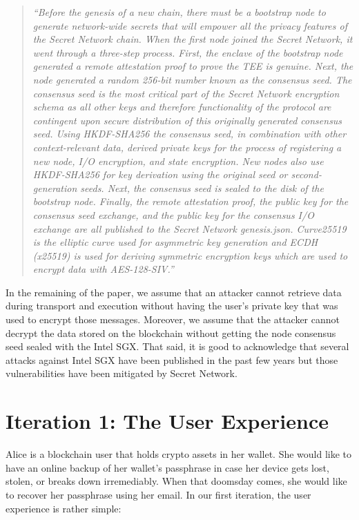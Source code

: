 \documentclass[runningheads]{llncs}
\begin{document}
\begin{quote}
{\em ``Before the genesis of a new chain, there must be a bootstrap node to generate network-wide secrets that will empower all the privacy features of the Secret Network chain. When the first node joined the Secret Network, it went through a three-step process. First, the enclave of the bootstrap node generated a remote attestation proof to prove the TEE is genuine. Next, the node generated a random 256-bit number known as the consensus seed. The consensus seed is the most critical part of the Secret Network encryption schema as all other keys and therefore functionality of the protocol are contingent upon secure distribution of this originally generated consensus seed. Using HKDF-SHA256 the consensus seed, in combination with other context-relevant data, derived private keys for the process of registering a new node, I/O encryption, and state encryption. New nodes also use HKDF-SHA256 for key derivation using the original seed or second-generation seeds. Next, the consensus seed is sealed to the disk of the bootstrap node. Finally, the remote attestation proof, the public key for the consensus seed exchange, and the public key for the consensus I/O exchange are all published to the Secret Network genesis.json. Curve25519 is the elliptic curve used for asymmetric key generation and ECDH (x25519) is used for deriving symmetric encryption keys which are used to encrypt data with AES-128-SIV.''}\\
\end{quote}

In the remaining of the paper, we assume that an attacker cannot retrieve data during transport and execution without having the user's private key that was used to encrypt those messages. Moreover, we assume that the attacker cannot decrypt the data stored on the blockchain without getting the node consensus seed sealed with the Intel SGX. That said, it is good to acknowledge that several attacks against Intel SGX have been published in the past few years \cite{gotzfried2017cache,nilsson2020survey,murdock2020plundervolt,biondo2018guard} but those vulnerabilities have been mitigated by Secret Network. \\

\section{Iteration 1: The User Experience}
\label{iteration1}

Alice is a blockchain user that holds crypto assets in her wallet. She would like to have an online backup of her wallet's passphrase in case her device gets lost, stolen, or breaks down irremediably. When that doomsday comes, she would like to recover her passphrase using her email. In our first iteration, the user experience is rather simple: 
\end{document}
